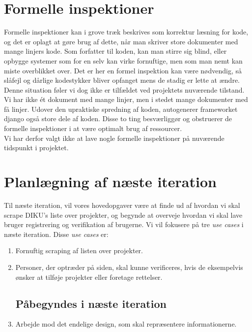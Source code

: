 \documentclass[11pt]{article}
\begin{document}
\section{Formelle inspektioner}
Formelle inspektioner kan i grove træk beskrives som korrektur læsning for kode, og det er oplagt at gøre brug af dette, når man skriver store dokumenter med mange linjers kode. Som forfatter til koden, kan man stirre sig blind, eller opbygge systemer som for en selv kan virke fornuftige, men som man nemt kan miste overblikket over. Det er her en formel inspektion kan være nødvendig, så slåfejl og dårlige kodestykker bliver opfanget mens de stadig er lette at ændre. \\
Denne situation føler vi dog ikke er tilfældet ved projektets nuværende tilstand. Vi har ikke ét dokument med mange linjer, men i stedet mange dokumenter med få linjer. Udover den upraktiske spredning af koden, autogenerer frameworket django også store dele af koden. Disse to ting besværliggør og obstruerer de formelle inspektioner i at være optimalt brug af ressourcer. \\
Vi har derfor valgt ikke at lave nogle formelle inspektioner på nuværende tidspunkt i projektet.
\section{Planlægning af næste iteration}
Til næste iteration, vil vores hovedopgaver være at finde ud af hvordan vi skal scrape DIKU's liste over projekter, og begynde at overveje hvordan vi skal lave bruger registrering og verifikation af brugerne.
Vi vil fokusere på tre \textit{use cases} i næste iteration. Disse \textit{use cases} er:
\begin{enumerate}
\subsection*{Forventes implementeret i næste iteration}
	\item \label{enum:scraping} Fornuftig scraping af listen over projekter.

	\item \label{enum:verifikation} Personer, der optræder på siden, skal kunne verificeres, hvis de eksempelvis ønsker at tilføje projekter eller foretage rettelser.

\subsection*{Påbegyndes i næste iteration}

	\item \label{enum:design} Arbejde mod det endelige design, som skal repræsentere informationerne.
\end{enumerate}
\end{document}
